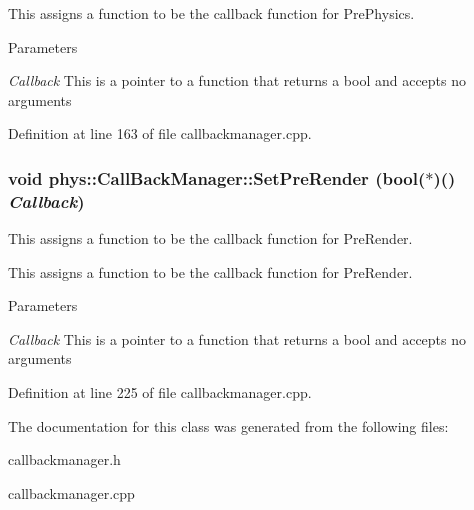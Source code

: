 This assigns a function to be the callback function for PrePhysics. 
\begin{DoxyParams}{Parameters}
\item[{\em Callback}]This is a pointer to a function that returns a bool and accepts no arguments \end{DoxyParams}


Definition at line 163 of file callbackmanager.cpp.

\hypertarget{classphys_1_1CallBackManager_a1e060fd479413457a798ea3c6b2bcb4d}{
\subsubsection[{SetPreRender}]{\setlength{\rightskip}{0pt plus 5cm}void phys::CallBackManager::SetPreRender (bool($\ast$)() {\em Callback})}}
\label{d1/d47/classphys_1_1CallBackManager_a1e060fd479413457a798ea3c6b2bcb4d}


This assigns a function to be the callback function for PreRender. 

This assigns a function to be the callback function for PreRender. 
\begin{DoxyParams}{Parameters}
\item[{\em Callback}]This is a pointer to a function that returns a bool and accepts no arguments \end{DoxyParams}


Definition at line 225 of file callbackmanager.cpp.



The documentation for this class was generated from the following files:\begin{DoxyCompactItemize}
\item 
callbackmanager.h\item 
callbackmanager.cpp\end{DoxyCompactItemize}
